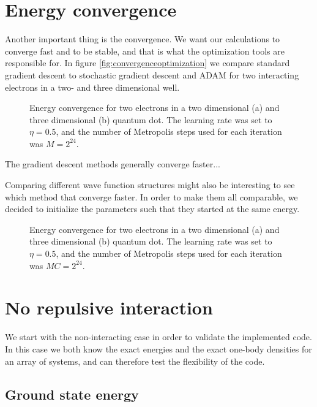 \newpage
\section{Energy convergence}
Another important thing is the convergence. We want our calculations to converge fast and to be stable, and that is what the optimization tools are responsible for. In figure \eqref{fig:convergenceoptimization} we compare standard gradient descent to stochastic gradient descent and ADAM for two interacting electrons in a two- and three dimensional well. 

\begin{figure} [H]
	\centering
	
	\caption{Energy convergence for two electrons in a two dimensional (a) and three dimensional (b) quantum dot. The learning rate was set to $\eta=0.5$, and the number of Metropolis steps used for each iteration was $M=2^{24}$.}
\end{figure}

The gradient descent methods generally converge faster...

Comparing different wave function structures might also be interesting to see which method that converge faster. In order to make them all comparable, we decided to initialize the parameters such that they started at the same energy. 

\begin{figure}[H]
	\centering
	\label{fig:convergenceoptimization}
	\caption{Energy convergence for two electrons in a two dimensional (a) and three dimensional (b) quantum dot. The learning rate was set to $\eta=0.5$, and the number of Metropolis steps used for each iteration was $MC=2^{24}$.}
\end{figure}

\newpage
\section{No repulsive interaction}
We start with the non-interacting case in order to validate the implemented code. In this case we both know the exact energies and the exact one-body densities for an array of systems, and can therefore test the flexibility of the code. 

\subsection{Ground state energy}
